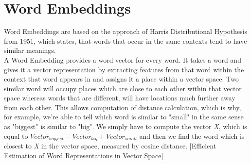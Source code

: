 \documentclass[a4paper, 11pt,titlepage,oneside,openany]{book}
\begin{document}
\section{Word Embeddings}
Word Embeddings are based on the approach of Harris Distributional Hypothesis from 1951, which states, that words that occur in the same contexts tend to have similar meanings. \\
\noindent A Word Embedding provides a word vector for every word. It takes a word and gives it a vector representation by extracting features from that word within the context that word appears in and assigns it a place within a vector space. Two similar word will occupy places which are close to each other within that vector space whereas words that are different, will have locations much further away from each other. This allows computation of distance calculation, which is why, for example, we're able to tell which word is similar to "small" in the same sense as "biggest" is similar to "big". We simply have to compute the vector \textit{X}, which is equal to $Vector_{biggest}-Vector_{big}+Vector_{small}$ and then we find the word which is closest to \textit{X} in the vector space, measured by cosine distance. [Efficient Estimation of Word Representations in Vector Space]
\end{document}

